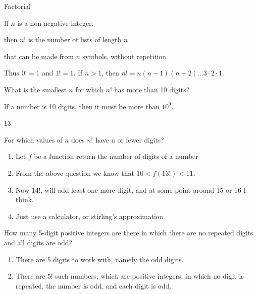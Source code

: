 \documentclass[openany, 12pt]{book}
\begin{document}
\begin{definition}{Factorial}{}
	\begin{blist}
		\item If $n$ is a non-negative integer,
		\item then $n!$ is the number of lists of length $n$
		\item that can be made from $n$ symbols, without repetition.
		\item Thus $0!=1$ and $1!=1$. If $n>1$, then $n!=n(n-1)(n-2) \ldots 3 \cdot 2 \cdot 1$.
	\end{blist}
\end{definition}

\begin{exercise}{}{}
	\begin{blist}
		\item What is the smallest $n$ for which $n!$ has more than 10 digits?
		\item If a number is 10 digits, then it must be more than $10^{9}$.
		\item 13
	\end{blist}
\end{exercise}

\begin{exercise}{}{}
	For which values of $n$ does $n!$ have n or fewer digits?
	\begin{enumerate}[label={\textbullet}, leftmargin=*, itemsep=0pt, parsep=0pt]
		\item Let $f$ be a function return the number of digits of a number
		\item From the above question we know that $10 < f(13!) < 11$.
		\item Now $14!$, will add least one more digit, and at some point around
		      15 or 16 I think.
		\item Just use a calculator, or stirling's approximation.
	\end{enumerate}
\end{exercise}

\begin{exercise}{}{}
	How many 5-digit positive integers are there in which there are no repeated
	digits and all digits are odd?
	\begin{enumerate}[label={\textbullet}, leftmargin=*, itemsep=0pt, parsep=0pt]
		\item There are 5 digits to work with, namely the odd digits.
		\item There are $5!$ such numbers, which are positive integers, in which
		      no digit is repeated, the number is odd, and each digit is odd.
	\end{enumerate}
\end{exercise}
\end{document}
